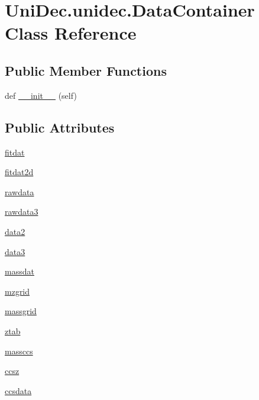 \hypertarget{class_uni_dec_1_1unidec_1_1_data_container}{}\section{Uni\+Dec.\+unidec.\+Data\+Container Class Reference}
\label{class_uni_dec_1_1unidec_1_1_data_container}
\subsection*{Public Member Functions}
\begin{DoxyCompactItemize}
\item 
def \hyperlink{class_uni_dec_1_1unidec_1_1_data_container_acd6b24fe46d315e0a69f7db134f347ea}{\+\_\+\+\_\+init\+\_\+\+\_\+} (self)
\end{DoxyCompactItemize}
\subsection*{Public Attributes}
\begin{DoxyCompactItemize}
\item 
\hyperlink{class_uni_dec_1_1unidec_1_1_data_container_a5abaca70d465e0c1933ae3daf651eaf4}{fitdat}
\item 
\hyperlink{class_uni_dec_1_1unidec_1_1_data_container_a15c6692ccdc56fe969744286a4cc607a}{fitdat2d}
\item 
\hyperlink{class_uni_dec_1_1unidec_1_1_data_container_aacbbbe6af1496772a23c81a734cb890f}{rawdata}
\item 
\hyperlink{class_uni_dec_1_1unidec_1_1_data_container_a9353af169ad1af4456c3df979a19f967}{rawdata3}
\item 
\hyperlink{class_uni_dec_1_1unidec_1_1_data_container_ab294961c9519fd77c909e673ea2d68f7}{data2}
\item 
\hyperlink{class_uni_dec_1_1unidec_1_1_data_container_a87d35c777d809bfde403494223b97b8e}{data3}
\item 
\hyperlink{class_uni_dec_1_1unidec_1_1_data_container_ac783814c0916b08c60073b16429f7e08}{massdat}
\item 
\hyperlink{class_uni_dec_1_1unidec_1_1_data_container_a2622bf2dc5734b0057990ecdc4d1d0e9}{mzgrid}
\item 
\hyperlink{class_uni_dec_1_1unidec_1_1_data_container_a4aaa0bf561bd8a711b423a9ead66b246}{massgrid}
\item 
\hyperlink{class_uni_dec_1_1unidec_1_1_data_container_ad3062e24b198c97058428910ee0a0f89}{ztab}
\item 
\hyperlink{class_uni_dec_1_1unidec_1_1_data_container_a757071f271a050d05cc46b949e579d60}{massccs}
\item 
\hyperlink{class_uni_dec_1_1unidec_1_1_data_container_a75f8dd3f3f0239e43451d0f2e7f08865}{ccsz}
\item 
\hyperlink{class_uni_dec_1_1unidec_1_1_data_container_a2fb119657631246fa4e6013430fdcdb6}{ccsdata}
\end{DoxyCompactItemize}


